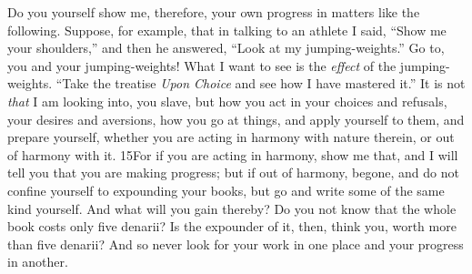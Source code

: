 Do you yourself show me, therefore, your own progress in matters like the following. Suppose, for example, that in talking to an athlete I said, ``Show me your shoulders,'' and then he answered, ``Look at my jumping-weights.'' Go to, you and your jumping-weights! What I want to see is the \emph{effect} of the jumping-weights. ``Take the treatise \emph{Upon Choice} and see how I have mastered it.'' It is not \emph{that} I am looking into, you slave, but how you act in your choices and refusals, your desires and aversions, how you go at things, and apply yourself to them, and prepare yourself, whether you are acting in harmony with nature therein, or out of harmony with it. 15For if you are acting in harmony, show me that, and I will tell you that you are making progress; but if out of harmony, begone, and do not confine yourself to expounding your books, but go and write some of the same kind yourself. And what will you gain thereby? Do you not know that the whole book costs only five denarii? Is the expounder of it, then, think you, worth more than five denarii? And so never look for your work in one place and your
progress in another.

